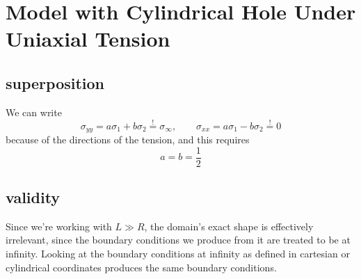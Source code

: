 \clearpage
\section{Model with Cylindrical Hole Under Uniaxial Tension}
\subsection{superposition}
We can write 
\begin{equation}
    \sigma_{yy}=a\sigma_1+b\sigma_2\overset{!}{=}\sigma_\infty,\qquad\sigma_{xx}=a\sigma_1-b\sigma_2 \overset{!}{=} 0
\end{equation}
because of the directions of the tension, and this requires
\begin{equation}
    a=b=\frac{1}{2}
\end{equation}
\subsection{validity}
Since we're working with \(L\gg R\), the domain's exact shape is effectively irrelevant, since the boundary conditions we produce from it are treated to be at infinity. Looking at the boundary conditions at infinity as defined in cartesian or cylindrical coordinates produces the same boundary conditions.
